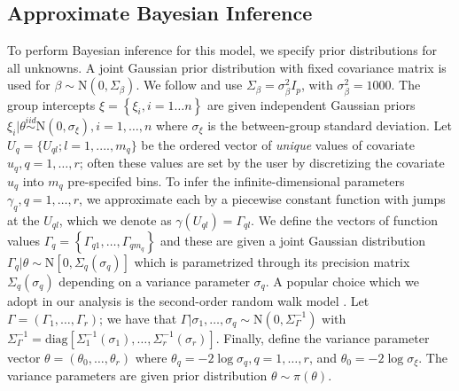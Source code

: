 \documentclass[]{article}
\begin{document}
\subsection{Approximate Bayesian Inference}

To perform Bayesian inference for this model, we specify prior distributions for all unknowns. A joint Gaussian prior distribution with fixed covariance matrix is used for $\beta \sim  \text{N}(0,\Sigma_\beta)$. We follow \citet{casecross} and use $\Sigma_{\beta} = \sigma^{2}_{\beta}I_{p}$, with $\sigma^{2}_{\beta} = 1000$. The group intercepts $\xi = \left\{ \xi_{i}, i = 1\ldots n\right\}$ are given independent Gaussian priors $\xi_{i} | \theta \stackrel{iid}{\sim} \text{N}(0,\sigma_{\xi}),i = 1,\ldots,n$ where $\sigma_{\xi}$ is the between-group standard deviation. Let $U_{q} = \{U_{ql};l = 1, ...., m_q\}$ be the ordered vector of \textit{unique} values of covariate $u_q,q = 1,\ldots,r$; often these values are set by the user by discretizing the covariate $u_q$ into $m_q$ pre-specifed bins. To infer the infinite-dimensional parameters $\gamma_{q},q = 1,\ldots,r$, we approximate each by a piecewise constant function with jumps at the $U_{ql}$, which we denote as $\gamma(U_{ql}) = \Gamma_{ql}$. We define the vectors of function values $\Gamma_{q} = \left\{ \Gamma_{q1},\ldots,\Gamma_{qm_{q}}\right\}$ and these are given a joint Gaussian distribution $\Gamma_{q}|\theta\sim\text{N}\left[ 0,\Sigma_{q}(\sigma_{q})\right]$ which is parametrized through its precision matrix $\Sigma_{q}(\sigma_{q})$ depending on a variance parameter $\sigma_{q}$. A popular choice which we adopt in our analysis is the second-order random walk model \citep{rw2}. Let $\Gamma = (\Gamma_{1},\ldots,\Gamma_{r})$; we have that $\Gamma|\sigma_{1},\ldots,\sigma_{q}\sim\text{N}\left( 0,\Sigma^{-1}_{\Gamma}\right)$ with $\Sigma^{-1}_{\Gamma} = \text{diag}\left[ \Sigma_{1}^{-1}(\sigma_{1}),\ldots,\Sigma_{r}^{-1}(\sigma_{r})\right]$. Finally, define the variance parameter vector $\theta = (\theta_{0},\ldots,\theta_{r})$ where $\theta_{q} = -2\log\sigma_{q},q = 1,\ldots,r$, and $\theta_{0} = -2\log\sigma_{\xi}$. The variance parameters are given prior distribution $\theta \sim \pi(\theta)$. 
\end{document}
